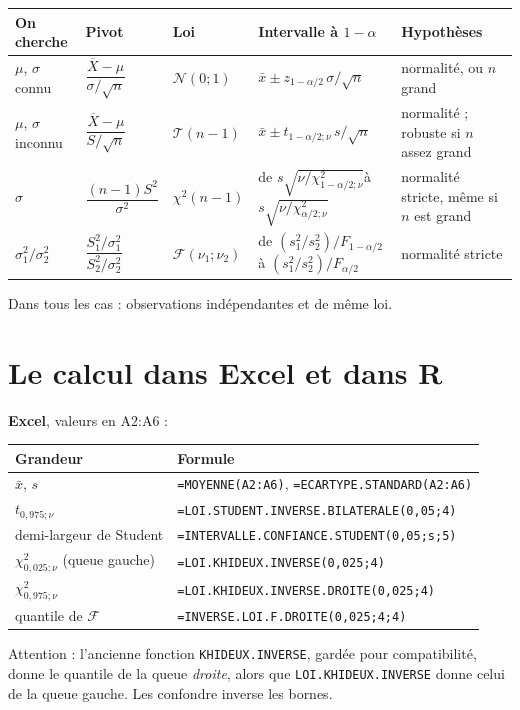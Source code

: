 \documentclass[11pt,a4paper]{article}
\theoremstyle{sj}
\theoremstyle{definition}
\theoremstyle{remark}
\newcommand{\N}{\mathcal{N}}
\newcommand{\nosp}[1]{{\XeTeXinterchartokenstate=0 #1}}
\newcommand{\Xb}{\overline{X}}
\newcommand{\chid}{\chi^2}
\begin{document}
\begin{center}
\small
\begin{tabular}{>{\raggedright\arraybackslash}p{1.8cm} p{2.2cm} p{1.6cm} >{\raggedright\arraybackslash}p{4.1cm} >{\raggedright\arraybackslash}p{2.7cm}}
\toprule
On cherche & Pivot & Loi & Intervalle à $1-\alpha$ & Hypothèses\\
\midrule
$\mu$, $\sigma$ connu & $\dfrac{\Xb-\mu}{\sigma/\sqrt n}$ & $\N(0;1)$ & $\bar x\pm z_{1-\alpha/2}\,\sigma/\sqrt n$ & normalité, ou $n$ grand\\[8pt]
$\mu$, $\sigma$ inconnu & $\dfrac{\Xb-\mu}{S/\sqrt n}$ & $\mathcal T(n-1)$ & $\bar x\pm t_{1-\alpha/2;\nu}\,s/\sqrt n$ & normalité ; robuste si $n$ assez grand\\[8pt]
$\sigma$ & $\dfrac{(n-1)S^2}{\sigma^2}$ & $\chid(n-1)$ & de $s\sqrt{\nu/\chid_{1-\alpha/2;\nu}}$\newline à $s\sqrt{\nu/\chid_{\alpha/2;\nu}}$ & normalité stricte, même si $n$ est grand\\[8pt]
$\sigma_1^2/\sigma_2^2$ & $\dfrac{S_1^2/\sigma_1^2}{S_2^2/\sigma_2^2}$ & $\mathcal F(\nu_1;\nu_2)$ & de $(s_1^2/s_2^2)/F_{1-\alpha/2}$\newline à $(s_1^2/s_2^2)/F_{\alpha/2}$ & normalité stricte\\
\bottomrule
\end{tabular}
\end{center}
Dans tous les cas : observations indépendantes et de même loi.

\section{Le calcul dans Excel et dans R}\label{sec:calcul}

\textbf{Excel}, valeurs en \nosp{A2:A6} :
\begin{center}
\footnotesize
\begin{tabular}{p{5.3cm} l}
\toprule
Grandeur & Formule\\
\midrule
$\bar x$, $s$ & \texttt{=MOYENNE(A2:A6)}, \texttt{=ECARTYPE.STANDARD(A2:A6)}\\
$t_{0{,}975;\nu}$ & \texttt{=LOI.STUDENT.INVERSE.BILATERALE(0,05;4)}\\
demi-largeur de Student & \texttt{=INTERVALLE.CONFIANCE.STUDENT(0,05;s;5)}\\
$\chid_{0{,}025;\nu}$ (queue gauche) & \texttt{=LOI.KHIDEUX.INVERSE(0,025;4)}\\
$\chid_{0{,}975;\nu}$ & \texttt{=LOI.KHIDEUX.INVERSE.DROITE(0,025;4)}\\
quantile de $\mathcal F$ & \texttt{=INVERSE.LOI.F.DROITE(0,025;4;4)}\\
\bottomrule
\end{tabular}
\end{center}
Attention : l'ancienne fonction \texttt{KHIDEUX.INVERSE}, gardée pour compatibilité, donne le quantile de la queue \emph{droite}, alors que \texttt{LOI.KHIDEUX.INVERSE} donne celui de la queue gauche. Les confondre inverse les bornes.
\end{document}
